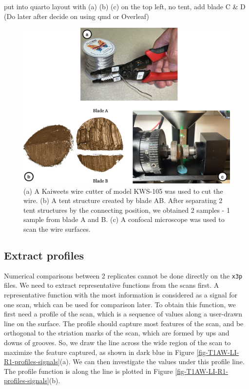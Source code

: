 \documentclass[fleqn,10pt]{wlscirep}
\newcommand{\tom}[1]{{\textcolor{RedOrange}{#1}}}
\begin{document}
\tom{put into quarto layout with (a) (b) (c) on the top left, no tent, add blade C \& D (Do later after decide on using qmd or Overleaf)}
\begin{figure}[ht]
\centering
\includegraphics[width=0.9\linewidth]{cut-tent-scan.png}
\caption{(a) A Kaiweets wire cutter of model KWS-105 was used to cut the wire. (b) A tent structure created by blade AB. After separating 2 tent structures by the connecting position, we obtained 2 samples - 1 sample from blade A and B. (c) A confocal microscope was used to scan the wire surfaces.}
\label{fig-cut-tent-scan}
\end{figure}

\subsection{Extract profiles}\label{sec-extract-profiles}

Numerical comparisons between 2 replicates cannot be done directly on
the \texttt{x3p} files. We need to extract representative functions from
the scans first. A representative function with the most information is
considered as a signal for one scan, which can be used for comparison
later. To obtain this function, we first need a profile of the scan,
which is a sequence of values along a user-drawn line on the surface.
The profile should capture most features of the scan, and be orthogonal
to the striation marks of the scan, which are formed by ups and downs of
grooves. So, we draw the line across the wide region of the scan to
maximize the feature captured, as shown in dark blue in Figure
\ref{fig-T1AW-LI-R1-profiles-signals}(a). We can then investigate the
values under this profile line. The profile function is along the line
is plotted in Figure \ref{fig-T1AW-LI-R1-profiles-signals}(b).
\end{document}
